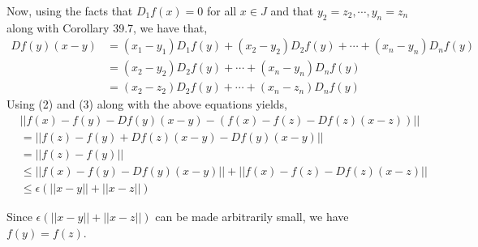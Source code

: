 \documentclass[12pt]{article}
\begin{document}
Now, using the facts that $D_1f(x) = 0$ for all $x \in J$ and that $y_{2} = z_{2}, \cdots, y_{n} = z_{n}$ along with Corollary 39.7, we have that,
\begin{align*}
Df(y)(x - y) &= (x_1 - y_1)D_1f(y) + (x_2 - y_2)D_2f(y) + \cdots + (x_n - y_n)D_nf(y)\\
&= (x_2 - y_2)D_2f(y) + \cdots + (x_n - y_n)D_nf(y)\\
&= (x_2 - z_2)D_2f(y) + \cdots + (x_n - z_n)D_nf(y)
\end{align*}
Using (2) and (3) along with the above equations yields,
\begin{align*}
&||f(x) - f(y) - Df(y)(x - y) - (f(x) - f(z) - Df(z)(x - z))||\\
&= ||f(z) - f(y) + Df(z)(x - y) - Df(y)(x - y)||\\
&= ||f(z) - f(y)||\\
&\leq ||f(x) - f(y) - Df(y)(x - y)|| + ||f(x) - f(z) - Df(z)(x - z)|| \\
&\leq \epsilon(||x - y|| + ||x - z||)
\end{align*}

Since $\epsilon(||x-y|| + ||x-z||)$ can be made arbitrarily small, we have $f(y) = f(z)$.
\end{document}
